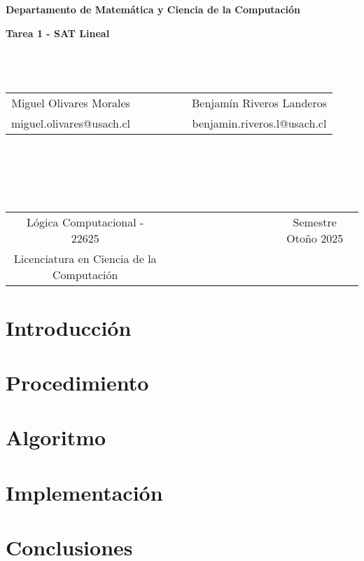 \documentclass{report}
\begin{document}
	\begin{titlepage}
		\begin{center}
			{\bf Departamento de Matem\'atica y Ciencia de la Computaci\'on}
		\end{center}
		\vspace{3cm}
		\begin{center}
			{\Large \bf Tarea 1 - SAT Lineal}
			~ \\ 
			~ \\ 
			~ \\
			~ \\
			\begin{tabular}{c c c}
				Miguel Olivares Morales & ~~~~~~~ & Benjam\'in Riveros Landeros \\
				miguel.olivares@usach.cl & & benjamin.riveros.l@usach.cl \\
			\end{tabular}
			~ \\ 
			~ \\ 
			~ \\
			~ \\
			\begin{tabular}{c c c}
				L\'ogica Computacional - 22625 & ~~~~~~~~~~~~~~~~~ & Semestre Oto\~no 2025 \\
				Licenciatura en Ciencia de la Computaci\'on & &  \\
			\end{tabular}
		\end{center}
	\end{titlepage}
	
	\section{Introducci\'on}
	
	\section{Procedimiento}
	
	\section{Algoritmo}
	
	\section{Implementaci\'on}
	
	\section{Conclusiones}
	
\end{document}
